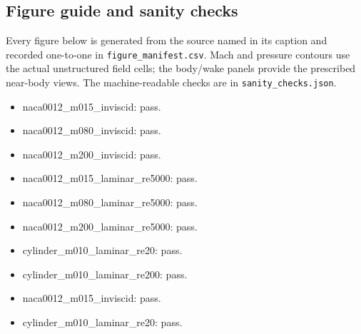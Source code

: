 \subsection{Figure guide and sanity checks}
Every figure below is generated from the source named in its caption and recorded one-to-one in \texttt{figure\_manifest.csv}. Mach and pressure contours use the actual unstructured field cells; the body/wake panels provide the prescribed near-body views. The machine-readable checks are in \texttt{sanity\_checks.json}.
\begin{itemize}
\item naca0012\_m015\_inviscid: pass.
\item naca0012\_m080\_inviscid: pass.
\item naca0012\_m200\_inviscid: pass.
\item naca0012\_m015\_laminar\_re5000: pass.
\item naca0012\_m080\_laminar\_re5000: pass.
\item naca0012\_m200\_laminar\_re5000: pass.
\item cylinder\_m010\_laminar\_re20: pass.
\item cylinder\_m010\_laminar\_re200: pass.
\item naca0012\_m015\_inviscid: pass.
\item cylinder\_m010\_laminar\_re20: pass.
\end{itemize}
